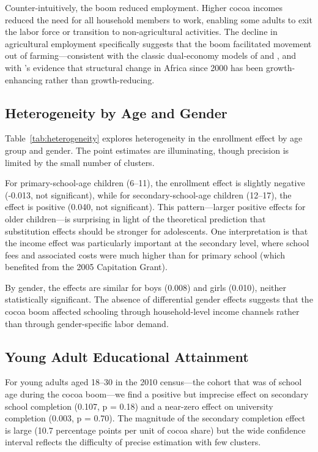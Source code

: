\documentclass[12pt]{article}
\begin{document}
Counter-intuitively, the boom reduced employment. Higher cocoa incomes reduced the need for all household members to work, enabling some adults to exit the labor force or transition to non-agricultural activities. The decline in agricultural employment specifically suggests that the boom facilitated movement out of farming---consistent with the classic dual-economy models of \citet{lewis1954} and \citet{harris1970}, and with \citet{mcmillan2014}'s evidence that structural change in Africa since 2000 has been growth-enhancing rather than growth-reducing.

\subsection{Heterogeneity by Age and Gender}



Table~\ref{tab:heterogeneity} explores heterogeneity in the enrollment effect by age group and gender. The point estimates are illuminating, though precision is limited by the small number of clusters.

For primary-school-age children (6--11), the enrollment effect is slightly negative (-0.013, not significant), while for secondary-school-age children (12--17), the effect is positive (0.040, not significant). This pattern---larger positive effects for older children---is surprising in light of the theoretical prediction that substitution effects should be stronger for adolescents. One interpretation is that the income effect was particularly important at the secondary level, where school fees and associated costs were much higher than for primary school (which benefited from the 2005 Capitation Grant).

By gender, the effects are similar for boys (0.008) and girls (0.010), neither statistically significant. The absence of differential gender effects suggests that the cocoa boom affected schooling through household-level income channels rather than through gender-specific labor demand.

\subsection{Young Adult Educational Attainment}

For young adults aged 18--30 in the 2010 census---the cohort that was of school age during the cocoa boom---we find a positive but imprecise effect on secondary school completion (0.107, p = 0.18) and a near-zero effect on university completion (0.003, p = 0.70). The magnitude of the secondary completion effect is large (10.7 percentage points per unit of cocoa share) but the wide confidence interval reflects the difficulty of precise estimation with few clusters.
\end{document}
